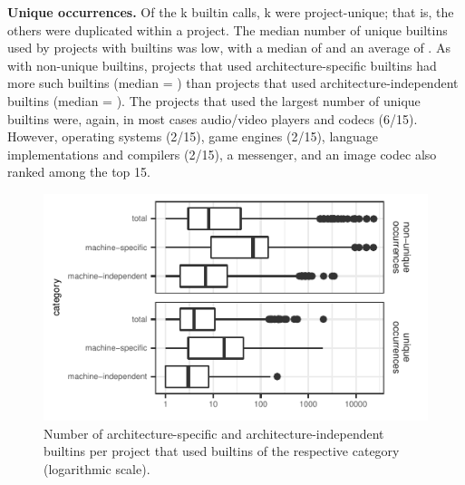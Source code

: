 \documentclass[sigconf,screen]{acmart}
\renewcommand{\paragraph}[1]{\textbf{#1}}
\begin{document}
\paragraph{Unique occurrences.}
Of the \kBuiltins{}k builtin calls, \kProjectUniqueBuiltins{}k were project-unique; that is, the others were duplicated within a project.
The median number of unique builtins used by projects with builtins was low, with a median of \medianNumberUniqueBuiltinsPerProject{} and an average of \avgNumberUniqueBuiltinsPerProject{}.
As with non-unique builtins, projects that used architecture-specific builtins had more such builtins (median = \medianNumberMachineSpecificUniqueBuiltinsPerProject{}) than projects that used architecture-independent builtins (median = \medianNumberMachineIndependentUniqueBuiltinsPerProject{}).
The projects that used the largest number of unique builtins were, again, in most cases audio/video players and codecs (6/15).
However, operating systems (2/15), game engines (2/15), language implementations and compilers (2/15), a messenger, and an image codec also ranked among the top 15.
\begin{figure}[tb]
    \centering
    \includegraphics[width=\columnwidth]{../generated/plots/boxplot_unique_cat.pdf}
    \caption{Number of architecture-specific and architecture-independent builtins per project that used builtins of the respective category (logarithmic scale).}
    \label{plot:nruniquefragments}
\end{figure}
\end{document}
